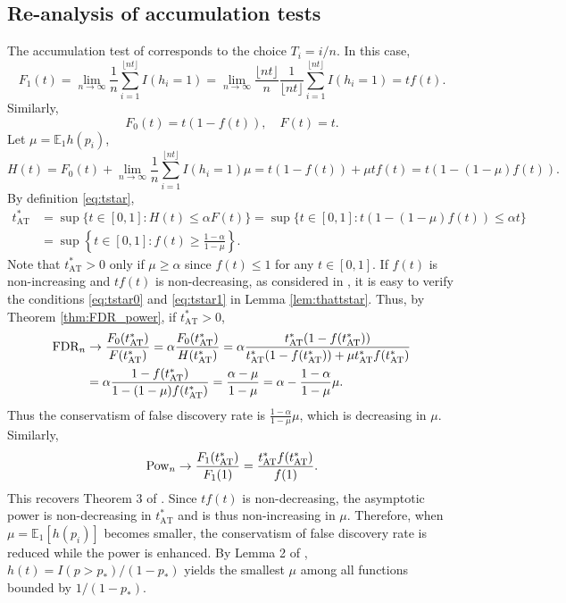 \documentclass{biometrika}
\newcommand{\FDR}{\textnormal{FDR}}
\newcommand{\Pow}{\textnormal{Pow}}
\newcommand{\pth}{p_{*}}
\newcommand{\E}{\mathbb{E}}
\newcommand{\1}{\mathbf{1}}
\begin{document}
\subsection{Re-analysis of accumulation tests}
The accumulation test of \citet{li2016accumulation} corresponds to the choice $T_{i} = i / n$. In this case,
\[F_{1}(t) = \lim_{n\rightarrow\infty}\frac{1}{n}\sum_{i=1}^{\lfloor nt\rfloor}I(h_{i} = 1) = \lim_{n\rightarrow\infty}\frac{\lfloor nt\rfloor}{n}\frac{1}{\lfloor nt\rfloor}\sum_{i=1}^{\lfloor nt\rfloor}I(h_{i} = 1) = tf(t).\]
Similarly,
\[F_{0}(t) = t(1 - f(t)), \quad F(t) = t.\]
Let $\mu = \E_{1}h(p_{i})$,
\[H(t) = F_{0}(t) + \lim_{n\rightarrow\infty}\frac{1}{n}\sum_{i=1}^{\lfloor nt\rfloor}I(h_{i} = 1)\mu = t(1 - f(t)) + \mu tf(t) = t(1 - (1 - \mu)f(t)).\]
By definition \eqref{eq:tstar},
\begin{align}
  t_{\mathrm{AT}}^{*} &= \sup\{t\in [0, 1]: H(t)\le \alpha F(t)\} = \sup\{t\in [0, 1]: t(1 - (1 - \mu)f(t))\le \alpha t\}\nonumber\\
& = \sup\left\{t\in [0, 1]: f(t) \ge \frac{1 - \alpha}{1 - \mu}\right\}\label{eq:tstarAT}.
\end{align}
Note that $t_{\mathrm{AT}}^{*} > 0$ only if $\mu\ge \alpha$ since $f(t)\le 1$ for any $t\in [0,1]$. If $f(t)$ is non-increasing and $tf(t)$ is non-decreasing, as considered in \cite{li2016accumulation}, it is easy to verify the conditions \eqref{eq:tstar0} and \eqref{eq:tstar1} in Lemma \ref{lem:thattstar}. Thus, by Theorem \ref{thm:FDR_power}, if $t_{\mathrm{AT}}^{*} > 0$,
\begin{align}
  \FDR_{n}&\rightarrow \frac{F_{0}(t_{\mathrm{AT}}^{*})}{F(t_{\mathrm{AT}}^{*})} = \alpha \frac{F_{0}(t_{\mathrm{AT}}^{*})}{H(t_{\mathrm{AT}}^{*})} = \alpha \frac{t_{\mathrm{AT}}^{*}(1 - f(t_{\mathrm{AT}}^{*}))}{t_{\mathrm{AT}}^{*}(1 - f(t_{\mathrm{AT}}^{*})) + \mu t_{\mathrm{AT}}^{*}f(t_{\mathrm{AT}}^{*})}\nonumber\\
& = \alpha \frac{1 - f(t_{\mathrm{AT}}^{*})}{1 - (1 - \mu)f(t_{\mathrm{AT}}^{*})} = \frac{\alpha - \mu}{1 - \mu} = \alpha - \frac{1 - \alpha}{1 - \mu}\mu.  \label{eq:FDR_AT}
\end{align}
Thus the conservatism of false discovery rate is $\frac{1 - \alpha}{1 - \mu}\mu$, which is decreasing in $\mu$. Similarly,
\begin{equation}
  \label{eq:power_AT}
  \Pow_{n}\rightarrow \frac{F_{1}(t_{\mathrm{AT}}^{*})}{F_{1}(1)} = \frac{t_{\mathrm{AT}}^{*}f(t_{\mathrm{AT}}^{*})}{f(1)}.
\end{equation}
This recovers Theorem 3 of \cite{li2016accumulation}. Since $tf(t)$ is non-decreasing, the asymptotic power is non-decreasing in $t_{\mathrm{AT}}^{*}$ and is thus non-increasing in $\mu$. Therefore, when $\mu = \E_{1}[h(p_{i})]$ becomes smaller, the conservatism of false discovery rate is reduced while the power is enhanced. By Lemma 2 of \cite{li2016accumulation}, $h(t) = I(p > \pth) / (1 - \pth)$ yields the smallest $\mu$ among all functions bounded by $1 / (1 - \pth)$. 
\end{document}
